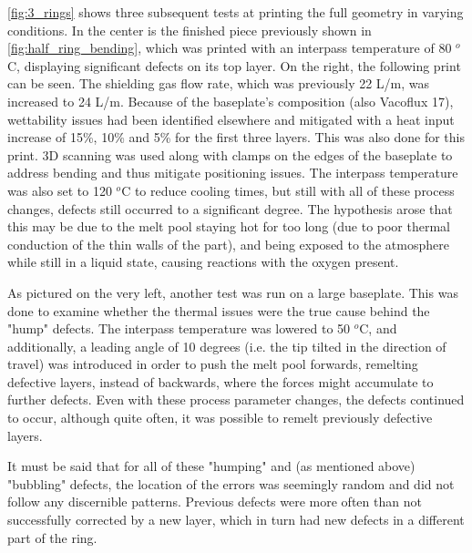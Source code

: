 \autoref{fig:3_rings} shows three subsequent tests at printing the full geometry in varying conditions. In the center is the finished piece previously shown in \autoref{fig:half_ring_bending}, which was printed with an interpass temperature of 80 $^o$C, displaying significant defects on its top layer. On the right, the following print can be seen. The shielding gas flow rate, which was previously 22 L/m, was increased to 24 L/m. Because of the baseplate's composition (also Vacoflux 17), wettability issues had been identified elsewhere and mitigated with a heat input increase of 15\%, 10\% and 5\% for the first three layers. This was also done for this print. 3D scanning was used along with clamps on the edges of the baseplate to address bending and thus mitigate positioning issues. The interpass temperature was also set to 120 $^o$C to reduce cooling times, but still with all of these process changes, defects still occurred to a significant degree. The hypothesis arose that this may be due to the melt pool staying hot for too long (due to poor thermal conduction of the thin walls of the part), and being exposed to the atmosphere while still in a liquid state, causing reactions with the oxygen present.

As pictured on the very left, another test was run on a large baseplate. This was done to examine whether the thermal issues were the true cause behind the "hump" defects. The interpass temperature was lowered to 50 $^o$C, and additionally, a leading angle of 10 degrees (i.e. the tip tilted in the direction of travel) was introduced in order to push the melt pool forwards, remelting defective layers, instead of backwards, where the forces might accumulate to further defects. Even with these process parameter changes, the defects continued to occur, although quite often, it was possible to remelt previously defective layers.

It must be said that for all of these "humping" and (as mentioned above) "bubbling" defects, the location of the errors was seemingly random and did not follow any discernible patterns. Previous defects were more often than not successfully corrected by a new layer, which in turn had new defects in a different part of the ring.



